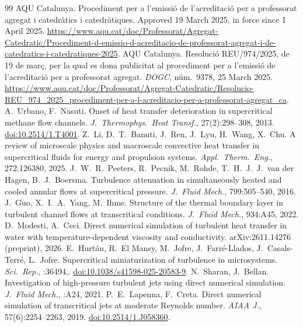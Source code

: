 \documentclass[11pt]{article}
\newcommand{\NEW}[1]{\iffinal #1\else{\color{red}#1}\fi}
\begin{document}
\begin{thebibliography}{99}
 AQU Catalunya. Procediment per a l'emissi\'o de l'acreditaci\'o per a professorat agregat i catedr\`atics i catedr\`atiques. Approved 19 March 2025, in force since 1 April 2025. {\def\UrlBreaks{\do\/\do\-}\url{https://www.aqu.cat/doc/Professorat/Agregat-Catedratic/Procediment-d-emissio-d-acreditacio-de-professorat-agregat-i-de-catedratics-i-catedratiques-2025}}.
 AQU Catalunya. Resoluci\'o REU/974/2025, de 19 de mar\c{c}, per la qual es dona publicitat al procediment per a l'emissi\'o de l'acreditaci\'o per a professorat agregat. \emph{DOGC}, n\'um.~9378, 25 March 2025. \url{https://www.aqu.cat/doc/Professorat/Agregat-Catedratic/Resolucio-REU_974_2025_procediment-per-a-l-acreditacio-per-a-professorat-agregat_ca}.
 A.\ Urbano, F.\ Nasuti. Onset of heat transfer deterioration in supercritical methane flow channels. \emph{J.\ Thermophys.\ Heat Transf.}, 27(2)\NEW{:298--308}, 2013. \href{https://doi.org/10.2514/1.T4001}{doi:10.2514/1.T4001}.
 Z.\ Li, D.\ T.\ Banuti, J.\ Ren, J.\ Lyu, H.\ Wang, X.\ Chu. A review of microscale physics and macroscale convective heat transfer in supercritical fluids for energy and propulsion systems. \emph{Appl.\ Therm.\ Eng.}, 272:126380, 2025.
 J.\ W.\ R.\ Peeters, R.\ Pecnik, M.\ Rohde, T.\ H.\ J.\ J.\ van der Hagen, B.\ J.\ Boersma. Turbulence attenuation in simultaneously heated and cooled annular flows at supercritical pressure. \emph{J.\ Fluid Mech.}, 799:505--540, 2016.
 J.\ Guo, X.\ I.\ A.\ Yang, M.\ Ihme. Structure of the thermal boundary layer in turbulent channel flows at transcritical conditions. \emph{J.\ Fluid Mech.}, 934:A45, 2022.
 D.\ Modesti, A.\ Ceci. Direct numerical simulation of turbulent heat transfer in water with temperature-dependent viscosity and conductivity. arXiv:2611.14276 (preprint), 2026.
 E.\ Hurt\'an, R.\ El Mansy, M.\ Jofre, J.\ Farr\'e-Llados, J.\ Casals-Terr\'e, L.\ Jofre. Supercritical miniaturization of turbulence in microsystems. \emph{Sci.\ Rep.}, \NEW{15:36494,} 2025. \href{https://doi.org/10.1038/s41598-025-20583-9}{doi:10.1038/s41598-025-20583-9}.
 N.\ Sharan, J.\ Bellan. Investigation of high-pressure turbulent jets using direct numerical simulation. \emph{J.\ Fluid Mech.}, \NEW{922:A24}, 2021.
 P.\ E.\ Lapenna, F.\ Creta. Direct numerical simulation of transcritical jets at moderate Reynolds number. \emph{AIAA J.}, 57(6)\NEW{:2254--2263}, 2019. \href{https://doi.org/10.2514/1.J058360}{doi:10.2514/1.J058360}.

\end{thebibliography}
\end{document}
